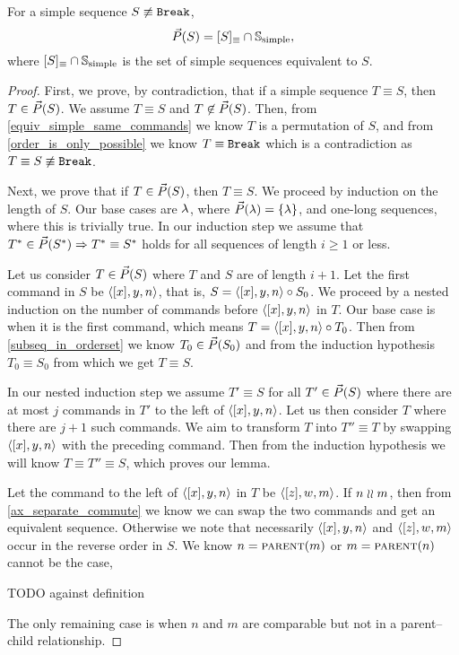 \begin{mylem}\label{simple_reorder_equiv}
For a simple sequence $S\not\equiv\mathtt{Break}$,
\[ \vec{P}({S}) = [S]_\equiv \cap \mathbb{S}_{\mathrm{simple}}, \]
where $[S]_\equiv \cap \mathbb{S}_{\mathrm{simple}}$ is the set of simple sequences equivalent to $S$.
\end{mylem}
\begin{proof}
First, we prove, by contradiction, that if a simple sequence $T\equiv S$, then $T\in\vec{P}({S})$.
We assume $T\equiv S$ and $T\not\in\vec{P}({S})$.
Then, from \cref{equiv_simple_same_commands} we know $T$ is a permutation of $S$,
and from \cref{order_is_only_possible} we know $T\equiv\mathtt{Break}$ which
is a contradiction as $T\equiv S\not\equiv\mathtt{Break}$.

Next, we prove that if $T\in\vec{P}({S})$, then $T\equiv S$.
We proceed by induction on the length of $S$.
Our base cases are $\lambda$, where $\vec{P}({\lambda})=\{\lambda\}$,
and one-long sequences, where this is trivially true.
In our induction step we assume that $T^*\in\vec{P}({S^*})\Rightarrow T^*\equiv S^*$ holds
for all sequences of length $i\geq 1$ or less.

Let us consider $T\in\vec{P}({S})$ where $T$ and $S$ are of length $i+1$.
Let the first command in $S$ be $\langle{[x],y,n}\rangle$, that is, $S=\langle{[x],y,n}\rangle\circ S_0$.
We proceed by a nested induction on the number of commands before $\langle{[x],y,n}\rangle$ in $T$.
Our base case is when it is the first command, which means $T=\langle{[x],y,n}\rangle\circ T_0$.
Then from \cref{subseq_in_orderset} we know $T_0\in\vec{P}({S_0})$
and from the induction hypothesis $T_0\equiv S_0$ from which we get $T\equiv S$.

In our nested induction step we assume $T'\equiv S$ for all $T'\in\vec{P}({S})$
where there are at most $j$ commands in $T'$ to the left of $\langle{[x],y,n}\rangle$.
Let us then consider $T$ where there are $j+1$ such commands.
We aim to transform $T$ into $T''\equiv T$ by swapping $\langle{[x],y,n}\rangle$ with the preceding
command. Then from the induction hypothesis we will know $T\equiv T''\equiv S$,
which proves our lemma.

Let the command to the left of $\langle{[x],y,n}\rangle$ in $T$ be $\langle{[z],w,m}\rangle$.
If $n\mathrel{\wr\wr} m$, then from \cref{ax_separate_commute} we know we can swap the two commands
and get an equivalent sequence.
Otherwise we note that necessarily $\langle{[x],y,n}\rangle$ and $\langle{[z],w,m}\rangle$ occur in the reverse order in $S$.
We know $n=\text{\normalfont\scshape{parent}}(m)$ or $m=\text{\normalfont\scshape{parent}}(n)$ cannot be the case,

TODO against definition

The only remaining case is when $n$ and $m$ are comparable but not in a parent--child relationship.



\end{proof}
